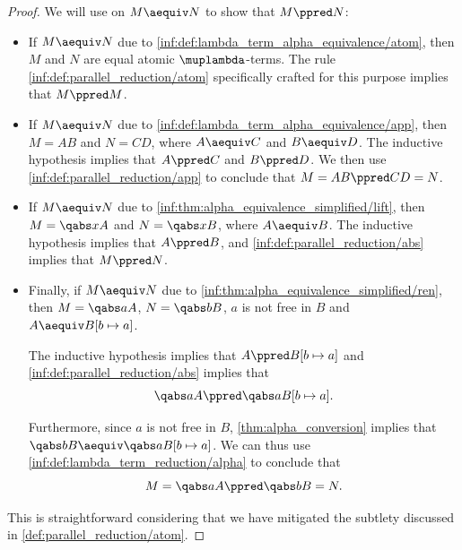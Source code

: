 \begin{proof}
   We will use  on \( M \aequiv N \) to show that \( M \ppred N \):
  \begin{itemize}
    \item If \( M \aequiv N \) due to \ref{inf:def:lambda_term_alpha_equivalence/atom}, then \( M \) and \( N \) are equal atomic \( \muplambda \)-terms. The rule \ref{inf:def:parallel_reduction/atom} specifically crafted for this purpose implies that \( M \ppred M \).

    \item If \( M \aequiv N \) due to \ref{inf:def:lambda_term_alpha_equivalence/app}, then \( M = AB \) and \( N = CD \), where \( A \aequiv C \) and \( B \aequiv D \). The inductive hypothesis implies that \( A \ppred C \) and \( B \ppred D \). We then use \ref{inf:def:parallel_reduction/app} to conclude that \( M = AB \ppred CD = N \).

    \item If \( M \aequiv N \) due to \ref{inf:thm:alpha_equivalence_simplified/lift}, then \( M = \qabs x A \) and \( N = \qabs x B \), where \( A \aequiv B \). The inductive hypothesis implies that \( A \ppred B \), and \ref{inf:def:parallel_reduction/abs} implies that \( M \ppred N \).

    \item Finally, if \( M \aequiv N \) due to \ref{inf:thm:alpha_equivalence_simplified/ren}, then \( M = \qabs a A \), \( N = \qabs b B \), \( a \) is not free in \( B \) and \( A \aequiv B[b \mapsto a] \).

    The inductive hypothesis implies that \( A \ppred B[b \mapsto a] \) and \ref{inf:def:parallel_reduction/abs} implies that
    \begin{equation*}
      \qabs a A \ppred \qabs a B[b \mapsto a].
    \end{equation*}

    Furthermore, since \( a \) is not free in \( B \), \cref{thm:alpha_conversion} implies that \( \qabs b B \aequiv \qabs a B[b \mapsto a] \). We can thus use \ref{inf:def:lambda_term_reduction/alpha} to conclude that
    \begin{equation*}
      M = \qabs a A \ppred \qabs b B = N.
    \end{equation*}
  \end{itemize}

   This is straightforward considering that we have mitigated the subtlety discussed in \cref{def:parallel_reduction/atom}.


\end{proof}
